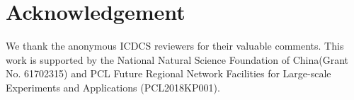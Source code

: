 \section{Acknowledgement}
\label{section:acknowledgement}
We thank the anonymous ICDCS reviewers for their valuable comments. This work is supported by the National Natural Science Foundation of China(Grant No. 61702315) and PCL Future Regional Network Facilities for Large-scale Experiments and Applications (PCL2018KP001).